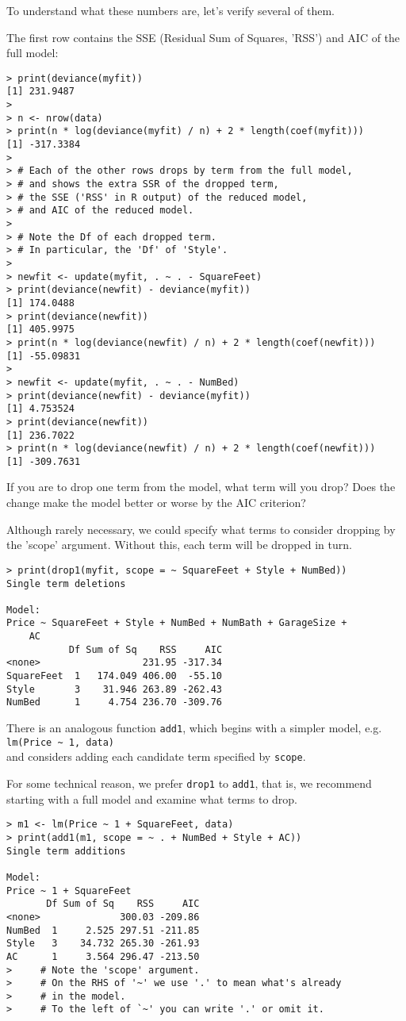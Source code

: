 \documentclass[12pt]{article}
\begin{document}
To understand what these numbers are,
let's verify several of them.

The first row contains the SSE (Residual Sum of Squares, 'RSS')
and AIC of the full model:
\begin{verbatim}
> print(deviance(myfit))
[1] 231.9487
> 
> n <- nrow(data)
> print(n * log(deviance(myfit) / n) + 2 * length(coef(myfit)))
[1] -317.3384
> 
> # Each of the other rows drops by term from the full model,
> # and shows the extra SSR of the dropped term,
> # the SSE ('RSS' in R output) of the reduced model,
> # and AIC of the reduced model.
> 
> # Note the Df of each dropped term.
> # In particular, the 'Df' of 'Style'.
> 
> newfit <- update(myfit, . ~ . - SquareFeet)
> print(deviance(newfit) - deviance(myfit))
[1] 174.0488
> print(deviance(newfit))
[1] 405.9975
> print(n * log(deviance(newfit) / n) + 2 * length(coef(newfit)))
[1] -55.09831
> 
> newfit <- update(myfit, . ~ . - NumBed)
> print(deviance(newfit) - deviance(myfit))
[1] 4.753524
> print(deviance(newfit))
[1] 236.7022
> print(n * log(deviance(newfit) / n) + 2 * length(coef(newfit)))
[1] -309.7631
\end{verbatim}

\exercise
If you are to drop one term from the model,
what term will you drop?
Does the change make the model better or worse
by the AIC criterion?

Although rarely necessary,
we could specify what terms to consider dropping
by the 'scope' argument.
Without this, each term will be dropped in turn.
\begin{verbatim}
> print(drop1(myfit, scope = ~ SquareFeet + Style + NumBed))
Single term deletions

Model:
Price ~ SquareFeet + Style + NumBed + NumBath + GarageSize + 
    AC
           Df Sum of Sq    RSS     AIC
<none>                  231.95 -317.34
SquareFeet  1   174.049 406.00  -55.10
Style       3    31.946 263.89 -262.43
NumBed      1     4.754 236.70 -309.76
\end{verbatim}

There is an analogous function \verb+add1+,
which begins with a simpler model, e.g.\\
\verb+lm(Price ~ 1, data)+
\\
and considers adding each candidate term specified
by \verb+scope+.

For some technical reason,
we prefer \verb+drop1+ to \verb+add1+, that is,
we recommend starting with a full model and examine what terms to drop.

\begin{verbatim}
> m1 <- lm(Price ~ 1 + SquareFeet, data)
> print(add1(m1, scope = ~ . + NumBed + Style + AC))
Single term additions

Model:
Price ~ 1 + SquareFeet
       Df Sum of Sq    RSS     AIC
<none>              300.03 -209.86
NumBed  1     2.525 297.51 -211.85
Style   3    34.732 265.30 -261.93
AC      1     3.564 296.47 -213.50
>     # Note the 'scope' argument.
>     # On the RHS of '~' we use '.' to mean what's already
>     # in the model.
>     # To the left of `~' you can write '.' or omit it.
\end{verbatim}
\end{document}

